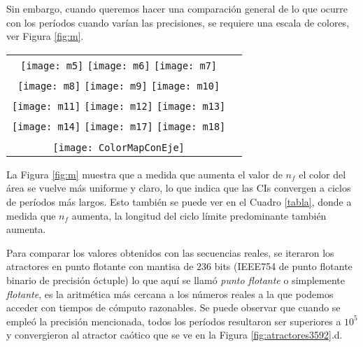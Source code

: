 Sin embargo, cuando queremos hacer una comparación general de lo que ocurre con los períodos cuando varían las precisiones, se requiere una escala de colores, ver Figura \ref{fig:m}.
%
\begin{figure*}
	\centering
	\begin{tabular}{cc}
		\texttt{[image: m5]}
		\texttt{[image: m6]}
		\texttt{[image: m7]}\\
		\texttt{[image: m8]}
		\texttt{[image: m9]}
		\texttt{[image: m10]}\\
		\texttt{[image: m11]}
		\texttt{[image: m12]}
		\texttt{[image: m13]}\\
		\texttt{[image: m14]}
		\texttt{[image: m17]}
		\texttt{[image: m18]}\\
		\\   
		\texttt{[image: ColorMapConEje]}
	\end{tabular}
	\caption{Evolución de las longitudes de período de los dominios de atracción para: (a) $n_f=5$, (b) $n_f=6$, (c) $n_f=7$, (d) $n_f=8$, (e) $n_f=9$, (f) $n_f=10$, (g) $n_f=11$, (h) $n_f=12$, (i) $n_f=13$, (j) $n_f=14$, (k) $n_f=17$, (l) $n_f=18$.}
	\label{fig:m}
\end{figure*}

La Figura \ref{fig:m} muestra que a medida que aumenta el valor de $n_f$ el color del área se vuelve más uniforme y claro, lo que indica que las CIs convergen a ciclos de períodos más largos.
Esto también se puede ver en el Cuadro \ref{tabla}, donde a medida que $n_f$ aumenta, la longitud del ciclo límite predominante también aumenta.

Para comparar los valores obtenidos con las secuencias reales, se iteraron los atractores en punto flotante con mantisa de $236$ bits (IEEE754 de punto flotante binario de precisión óctuple) lo que aquí se llamó \textit{punto flotante} o simplemente \textit{flotante}, es la aritmética más cercana a los números reales a la que podemos acceder con tiempos de cómputo razonables.
Se puede observar que cuando se empleó la precisión mencionada, todos los períodos resultaron ser superiores a $10 ^ 5$ y convergieron al atractor caótico que se ve en la Figura \ref{fig:atractores3592}.d.

